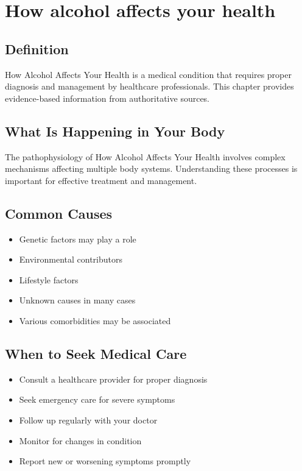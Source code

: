 
\chapter{How alcohol affects your health}

\section*{Definition}
How Alcohol Affects Your Health is a medical condition that requires proper diagnosis and management by healthcare professionals. This chapter provides evidence-based information from authoritative sources.

\section*{What Is Happening in Your Body}
The pathophysiology of How Alcohol Affects Your Health involves complex mechanisms affecting multiple body systems. Understanding these processes is important for effective treatment and management.

\section*{Common Causes}
\begin{itemize}
  \item Genetic factors may play a role
  \item Environmental contributors
  \item Lifestyle factors
  \item Unknown causes in many cases
  \item Various comorbidities may be associated
\end{itemize}

\section*{When to Seek Medical Care}
\begin{itemize}
  \item Consult a healthcare provider for proper diagnosis
  \item Seek emergency care for severe symptoms
  \item Follow up regularly with your doctor
  \item Monitor for changes in condition
  \item Report new or worsening symptoms promptly
\end{itemize}

